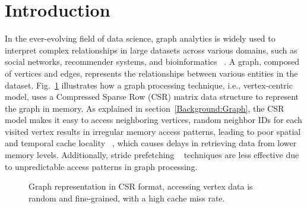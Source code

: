 \documentclass[conference]{IEEEtran}
\begin{document}
\section{Introduction}
In the ever-evolving field of data science, graph analytics is widely used to interpret complex relationships in large datasets across various domains, such as social networks, recommender systems, and bioinformatics ~\cite{ang_introducing_2010,lee_extrav_2017,zhou_graph_2019}. A graph, composed of vertices and edges, represents the relationships between various entities in the dataset. Fig.~\ref{fig:fig1} illustrates how a graph processing technique, i.e., vertex-centric model, uses a Compressed Sparse Row (CSR) matrix data structure to represent the graph in memory. As explained in section~\ref{Background:Graph}, the CSR model makes it easy to access neighboring vertices, random neighbor IDs for each visited vertex results in irregular memory access patterns, leading to poor spatial and temporal cache locality ~\cite{lumsdaine_challenges_2007,beamer_locality_2015,beamer_reducing_2017,wei_speedup_2016}, which causes delays in retrieving data from lower memory levels. Additionally, stride prefetching ~\cite{baradaran_energy_2023,ansari_mana_2021,ferdman_proactive_2011,kolli_rdip_2013} techniques are less effective due to unpredictable access patterns in graph processing.
\begin{figure}[t]
  \centering
  
  \caption{Graph representation in CSR format, accessing vertex data is random and fine-grained, with a high cache miss rate.}
  \label{fig:fig1}
\end{figure}


 

\end{document}
